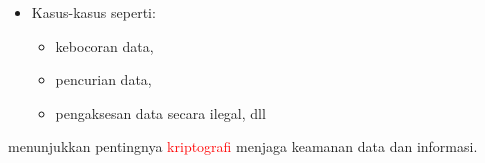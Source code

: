 \documentclass{article}
\begin{document}

\begin{itemize}
  \item Kasus-kasus seperti:
  \begin{itemize}
    \item kebocoran data,
    \item pencurian data,
    \item pengaksesan data secara ilegal, dll
  \end{itemize}
\end{itemize}

menunjukkan pentingnya \textcolor{red}{kriptografi} menjaga keamanan data dan informasi.
\end{document}

